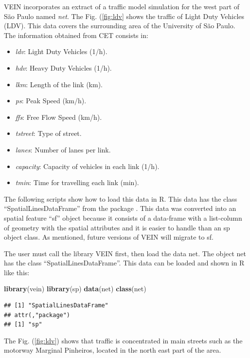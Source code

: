 \documentclass[12pt,graybox,envcountchap,sectrefs]{krantz}
\makeatletter
\newenvironment{Shaded}{\begin{snugshade}}{\end{snugshade}}
\newcommand{\KeywordTok}[1]{\textcolor[rgb]{0.13,0.29,0.53}{\textbf{#1}}}
\newcommand{\NormalTok}[1]{#1}
\providecommand{\tightlist}{%
  \setlength{\itemsep}{0pt}\setlength{\parskip}{0pt}}
\newenvironment{kframe}{%
\medskip{}
\setlength{\fboxsep}{.8em}
 \def\at@end@of@kframe{}%
 \ifinner\ifhmode%
  \def\at@end@of@kframe{\end{minipage}}%
  \begin{minipage}{\columnwidth}%
 \fi\fi%
 \def\FrameCommand##1{\hskip\@totalleftmargin \hskip-\fboxsep
 \colorbox{shadecolor}{##1}\hskip-\fboxsep
     \hskip-\linewidth \hskip-\@totalleftmargin \hskip\columnwidth}%
 \MakeFramed {\advance\hsize-\width
   \@totalleftmargin\z@ \linewidth\hsize
   \@setminipage}}%
 {\par\unskip\endMakeFramed%
 \at@end@of@kframe}
\renewenvironment{Shaded}{\begin{kframe}}{\end{kframe}}
\theoremstyle{definition}
\theoremstyle{definition}
\theoremstyle{definition}
\theoremstyle{remark}
\makeatother
\begin{document}
VEIN incorporates an extract of a traffic model simulation for the west
part of São Paulo named \emph{net}. The Fig. (\ref{fig:ldv} shows the
traffic of Light Duty Vehicles (LDV). This data covers the surrounding
area of the University of São Paulo. The information obtained from CET
consists in:

\begin{itemize}
\tightlist
\item
  \emph{ldv}: Light Duty Vehicles (1/h).
\item
  \emph{hdv}: Heavy Duty Vehicles (1/h).
\item
  \emph{lkm}: Length of the link (km).
\item
  \emph{ps}: Peak Speed (km/h).
\item
  \emph{ffs}: Free Flow Speed (km/h).
\item
  \emph{tstreet}: Type of street.
\item
  \emph{lanes}: Number of lanes per link.
\item
  \emph{capacity}: Capacity of vehicles in each link (1/h).
\item
  \emph{tmin}: Time for travelling each link (min).
\end{itemize}

The following scripts show how to load this data in R. This data has the
class ``SpatialLinesDataFrame'' from the package \citep{sp}. This data
was converted into an spatial feature ``sf'' object \citep{sf} because
it consists of a data-frame with a list-column of geometry with the
spatial attributes and it is easier to handle than an sp object class.
As mentioned, future versions of VEIN will migrate to sf.

The user must call the library VEIN first, then load the data net. The
object net has the class ``SpatialLinesDataFrame''. This data can be
loaded and shown in R like this:

\begin{Shaded}
\begin{Highlighting}[]
\KeywordTok{library}\NormalTok{(vein)}
\KeywordTok{library}\NormalTok{(sp)}
\KeywordTok{data}\NormalTok{(net)}
\KeywordTok{class}\NormalTok{(net)}
\end{Highlighting}
\end{Shaded}

\begin{verbatim}
## [1] "SpatialLinesDataFrame"
## attr(,"package")
## [1] "sp"
\end{verbatim}

The Fig. (\ref{fig:ldv}) shows that traffic is concentrated in main
streets such as the motorway Marginal Pinheiros, located in the north
east part of the area.
\end{document}
